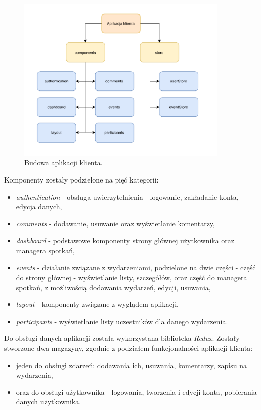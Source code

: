 \documentclass[12pt]{article}
\begin{document}
\begin{figure}[H]
\centering
\includegraphics[width=0.9\textwidth]{client.pdf}
\caption{Budowa aplikacji klienta.}
\end{figure}

Komponenty zostały podzielone na pięć kategorii:
\begin{itemize}
\item \textit{authentication} - obsługa uwierzytelnienia - logowanie, zakładanie konta, edycja danych,
\item \textit{comments} - dodawanie, usuwanie oraz wyświetlanie komentarzy,
\item \textit{dashboard} - podstawowe komponenty strony głównej użytkownika oraz managera spotkań,
\item \textit{events} - działanie związane z wydarzeniami, podzielone na dwie części - część do strony głównej - wyświetlanie listy, szczegółów, oraz część do managera spotkań, z możliwością dodawania wydarzeń, edycji, usuwania,
\item \textit{layout} - komponenty związane z wyglądem aplikacji,
\item \textit{participants} - wyświetlanie listy uczestników dla danego wydarzenia.
\end{itemize}

Do obsługi danych aplikacji została wykorzystana biblioteka \textit{Redux}. Zostały stworzone dwa magazyny, zgodnie z podziałem funkcjonalności aplikacji klienta: 
\begin{itemize}
\item jeden do obsługi zdarzeń: dodawania ich, usuwania, komentarzy, zapisu na wydarzenia,
\item oraz do obsługi użytkownika - logowania, tworzenia i edycji konta, pobierania danych użytkownika.
\end{itemize}
\end{document}
